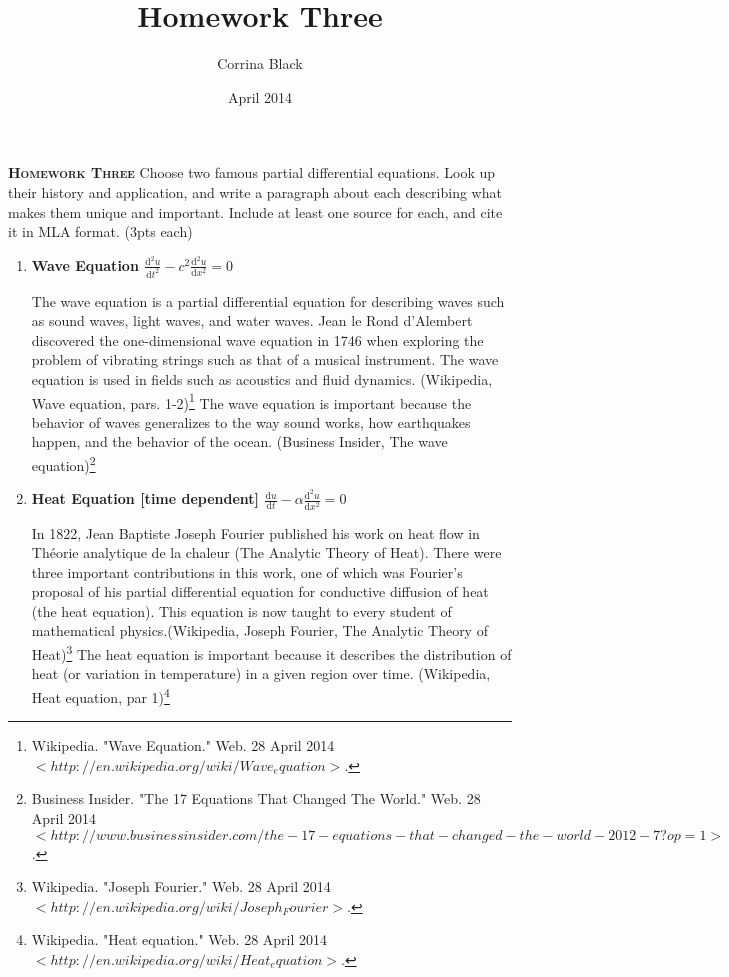 \documentclass[12pt,a4paper,oneside,draft]{article}
\title{Homework Three}
\author{Corrina Black}
\date{April 2014}
\begin{document}
\noindent\textsc{\Large\textbf{Homework Three}}
\newline
\newline
\normalsize  
Choose two famous partial differential equations. Look up their history and application, and write a paragraph about each describing what makes them unique and important. Include at least one source for each, and cite it in MLA format. (3pts each)
\begin{enumerate}
     \large\item\textbf{Wave Equation $\frac{\mathrm d^2 u}{\mathrm d t^2} - c^2 \frac{\mathrm d^2 u}{\mathrm d x^2} = 0$}
	 \newline
     \begin{normalsize}
     The wave equation is a partial differential equation for describing waves such as sound waves, light waves, and water waves. Jean le Rond d'Alembert discovered the one-dimensional wave equation in 1746 when exploring the problem of vibrating strings such as that of a musical instrument. The wave equation is used in fields such as acoustics and fluid dynamics. (Wikipedia, Wave equation, pars. 1-2)\footnote{\tiny\raggedright Wikipedia. "Wave Equation." Web. 28 April 2014 $<http://en.wikipedia.org/wiki/Wave_equation>$.} The wave equation is important because the behavior of waves generalizes to the way sound works, how earthquakes happen, and the behavior of the ocean. (Business Insider, The wave equation)\footnote{\tiny\raggedright Business Insider. "The 17 Equations That Changed The World." Web. 28 April 2014 $<http://www.businessinsider.com/the-17-equations-that-changed-the-world-2012-7?op=1>$.}
     \end{normalsize}
     \large\item\textbf{Heat Equation [time dependent] $\frac{\mathrm d u}{\mathrm d t} - \alpha \frac{\mathrm d^2 u}{\mathrm d x^2} = 0$}
	 \newline
     \begin{normalsize}
     In 1822, Jean Baptiste Joseph Fourier published his work on heat flow in Théorie analytique de la chaleur (The Analytic Theory of Heat). There were three important contributions in this work, one of which was Fourier's proposal of his partial differential equation for conductive diffusion of heat (the heat equation). This equation is now taught to every student of mathematical physics.(Wikipedia, Joseph Fourier, The Analytic Theory of Heat)\footnote{\tiny\raggedright Wikipedia. "Joseph Fourier." Web. 28 April 2014 $<http://en.wikipedia.org/wiki/Joseph_Fourier>$.} The heat equation is important because it describes the distribution of heat (or variation in temperature) in a given region over time. (Wikipedia, Heat equation, par 1)\footnote{\tiny\raggedright Wikipedia. "Heat equation." Web. 28 April 2014 $<http://en.wikipedia.org/wiki/Heat_equation>$.}
     \end{normalsize}
\end{enumerate}
\end{document}

